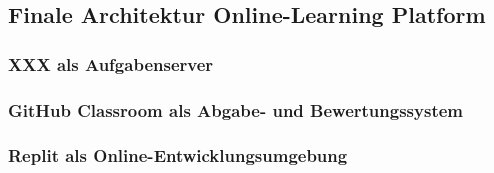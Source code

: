\subsection{Finale Architektur Online-Learning Platform}
\subsubsection{XXX als Aufgabenserver}
\subsubsection{GitHub Classroom als Abgabe- und Bewertungssystem}
\subsubsection{Replit als Online-Entwicklungsumgebung}